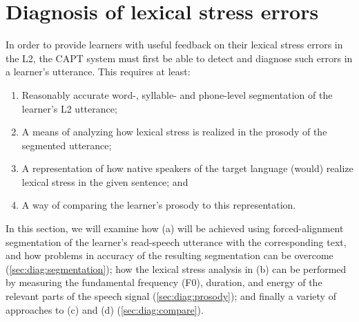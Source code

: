 %
%
\chapter{Diagnosis of lexical stress errors}
\label{chap:diagnosis}


In order to provide learners with useful feedback on their lexical stress errors in the L2, the CAPT system must first be able to detect and diagnose such errors in a learner's utterance. This requires at least:
\begin{enumerate}[label=(\alph*)]
\item Reasonably accurate word-, syllable- and phone-level segmentation of the learner's L2 utterance; %
\item A means of analyzing how lexical stress is realized in the prosody of the segmented utterance;
\item A representation of how native speakers of the target language (would) realize  lexical stress in the given sentence; and
\item A way of comparing the learner's prosody to this representation. 
\end{enumerate}

In this section, we will examine how (a) will be achieved using forced-alignment segmentation of the learner's read-speech utterance with the corresponding text, and how problems in accuracy of the resulting segmentation can be overcome (\cref{sec:diag:segmentation}); how the lexical stress analysis in (b) can be performed by measuring the fundamental frequency (F0), duration, and energy of the relevant parts of the speech signal (\cref{sec:diag:prosody}); and finally a variety of approaches to (c) and (d) (\cref{sec:diag:compare}).

%
%	

